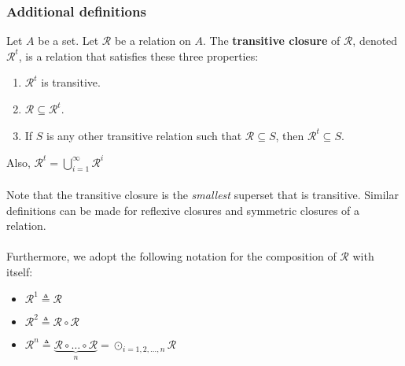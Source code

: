 \documentclass[a4paper]{article}
\begin{document}
\subsubsection{Additional definitions}
Let $A$ be a set. Let $\mathcal{R}$ be a relation on $A$. The \textbf{transitive closure} of $\mathcal{R}$, denoted $\mathcal{R}^t$, is a relation that satisfies these three properties:
\begin{enumerate}
	\item $\mathcal{R}^t$ is transitive.
	\item $\mathcal{R} \subseteq \mathcal{R}^t$.
	\item If $S$ is any other transitive relation such that $\mathcal{R} \subseteq S$, then $\mathcal{R}^t \subseteq S$.
\end{enumerate}
Also, $\mathcal{R}^t = \bigcup\limits_{i=1}^{\infty}\mathcal{R}^i$\\ \\
Note that the transitive closure is the \textit{smallest} superset that is transitive. Similar definitions can be made for reflexive closures and symmetric closures of a relation.\\ \\
Furthermore, we adopt the following notation for the composition of $\mathcal{R}$ with itself:
\begin{itemize}
	\item $\mathcal{R}^1 \triangleq \mathcal{R}$
	\item $\mathcal{R}^2 \triangleq \mathcal{R} \circ \mathcal{R}$
	\item $\mathcal{R}^n \triangleq \underbrace{\mathcal{R} \circ \dots \circ \mathcal{R}}_{n} = \odot_{i=1,2,\dots, n}\mathcal{R}$
\end{itemize}
\end{document}
